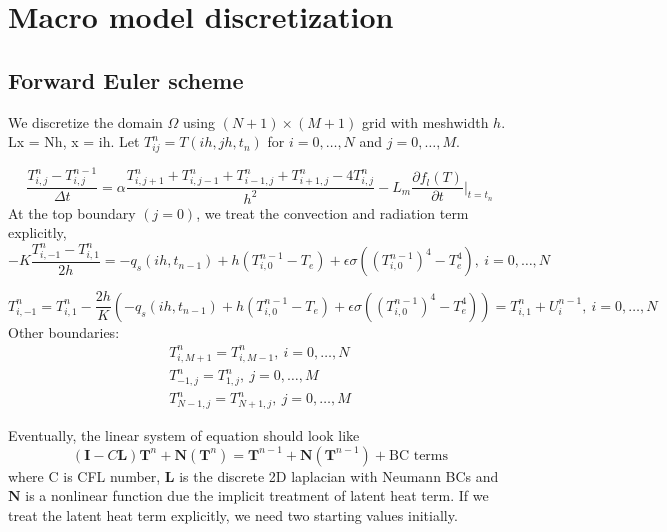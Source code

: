 \documentclass[a4paper,12pt]{article}
\newcommand{\B}[1]{\mathbf{#1}}
\newcommand{\yxb}[1]{  {\bf \color{red}{ Bao: #1}} }
\begin{document}
\section{Macro model discretization}
\subsection{Forward Euler scheme}
We discretize the domain $\Omega$ using $(N+1) \times (M+1)$ grid with meshwidth $h$. Lx = Nh, x = ih.
Let $T_{ij}^n=T(ih, jh, t_n )$ for $i=0,\dots,N$ and $j = 0, \dots, M$.

\begin{equation}
\frac{T_{i,j}^n - T_{i,j}^{n-1}}{\Delta t} = \alpha \frac{T_{i,j+1}^n + T_{i,j-1}^n + T_{i-1,j}^n + T_{i+1,j}^n - 4 T_{i,j}^n }{h^2} - L_m \frac{\partial f_l(T) }{\partial t} \bigg|_{t = t_n}
\end{equation}
At the top boundary $(j=0)$, we treat the convection and radiation term explicitly,
\begin{equation}
-K \frac{T_{i, -1}^n - T_{i,1}^n}{2h} = -q_s (ih, t_{n-1}) + h (T^{n-1}_{i,0} - T_e) + \epsilon \sigma ( (T^{n-1}_{i,0})^4 - T_e^4), \ i = 0 , \dots , N
\end{equation}

\begin{equation}
T_{i, -1}^n = T_{i,1}^n -\frac{2h}{K}\left(-q_s (ih, t_{n-1}) + h (T^{n-1}_{i,0} - T_e) + \epsilon \sigma ( (T^{n-1}_{i,0})^4 - T_e^4)\right)=T_{i,1}^n+U_i^{n-1}, \ i = 0 , \dots , N
\end{equation}
Other boundaries:
\begin{align}
T_{i, M+1}^n =T_{i,M-1}^n, \ i = 0 , \dots , N\\
T_{-1, j}^n =T_{1,j}^n, \ j = 0 , \dots ,M\\
T_{N-1, j}^n =T_{N+1,j}^n, \ j = 0 , \dots ,M
\end{align}

Eventually, the linear system of equation should look like 
\begin{equation}
(\B{I} - C\B{L} ) \B{T}^n + \B{N} (\B{T}^n) = \B{T}^{n-1} +\B{N} (\B{T}^{n-1})+ \text{BC terms}
\end{equation}
where C is CFL number, $\B{L}$ is the discrete 2D laplacian with Neumann BCs and $\B{N}$ is a nonlinear function due the implicit treatment of latent heat term. If we treat the latent heat term explicitly, we need two starting values initially. 

\end{document}
